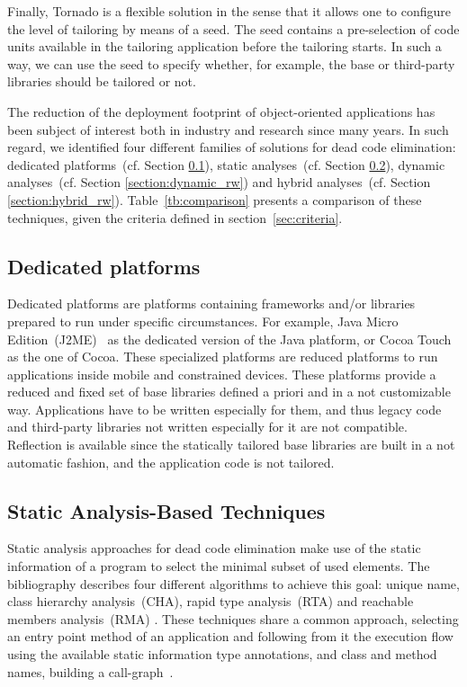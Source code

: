 Finally, Tornado is a flexible solution in the sense that it allows one to configure the level of tailoring by means of a seed. The seed contains a pre-selection of code units available in the tailoring application before the tailoring starts. In such a way, we can use the seed to specify whether, for example, the base or third-party libraries should be tailored or not.
 
The reduction of the deployment footprint of object-oriented applications has been subject of interest both in industry and research since many years. In such regard, we identified four different families of solutions for dead code elimination: dedicated platforms~(cf. Section \ref{section:static_selection_rw}), static analyses~(cf. Section \ref{section:static_rw}), dynamic analyses~(cf. Section \ref{section:dynamic_rw}) and hybrid analyses~(cf. Section \ref{section:hybrid_rw}). Table~\ref{tb:comparison} presents a comparison of these techniques, given the criteria defined in section~\ref{sec:criteria}.

\subsection{Dedicated platforms}%
\label{section:static_selection_rw}

Dedicated platforms are platforms containing frameworks and/or libraries prepared to run under specific circumstances. For example, Java Micro Edition~(J2ME)~\cite{JavaME} as the dedicated version of the Java platform, or Cocoa Touch as the one of Cocoa. These specialized platforms are reduced platforms to run applications inside mobile and constrained devices. These platforms provide a reduced and fixed set of base libraries defined a priori and in a not customizable way. Applications have to be written especially for them, and thus legacy code and third-party libraries not written especially for it are not compatible. Reflection is available since the statically tailored base libraries are built in a not automatic fashion, and the application code is not tailored.

\subsection{Static Analysis-Based Techniques}\label{section:static_rw}

Static analysis approaches for dead code elimination make use of the static information of a program to select the minimal subset of used elements. The bibliography describes four different algorithms to achieve this goal: unique name, class hierarchy analysis~(CHA), rapid type analysis~(RTA) and reachable members analysis~(RMA) \cite{Baco96a, Titz06a}. These techniques share a common approach, selecting an entry point method of an application and following from it the execution flow using the available static information \ie type annotations, and class and method names, building a call-graph~\cite{Grov97a}.

